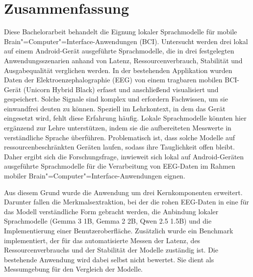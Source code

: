 \chapter*{Zusammenfassung}
Diese Bachelorarbeit behandelt die Eignung lokaler Sprachmodelle für mobile Brain"=Computer"=Interface-Anwendungen (BCI). Untersucht werden drei lokal auf einem Android-Gerät ausgeführte Sprachmodelle, die in drei festgelegten Anwendungsszenarien anhand von Latenz, Ressourcenverbrauch, Stabilität und Ausgabequalität verglichen werden. In der bestehenden Applikation wurden Daten der Elektroenzephalographie (EEG) von einem tragbaren mobilen BCI-Gerät (Unicorn Hybrid Black) erfasst und anschließend visualisiert und gespeichert. Solche Signale sind komplex und erfordern Fachwissen, um sie einwandfrei deuten zu können. Speziell im Lehrkontext, in dem das Gerät eingesetzt wird, fehlt diese Erfahrung häufig. Lokale Sprachmodelle könnten hier ergänzend zur Lehre unterstützen, indem sie die aufbereiteten Messwerte in verständliche Sprache überführen. Problematisch ist, dass solche Modelle auf ressourcenbeschränkten Geräten laufen, sodass ihre Tauglichkeit offen bleibt. Daher ergibt sich die Forschungsfrage, inwieweit sich lokal auf Android-Geräten ausgeführte Sprachmodelle für die Verarbeitung von EEG-Daten im Rahmen mobiler Brain"=Computer"=Interface-Anwendungen eignen.
\vspace{\baselineskip}

\noindent Aus diesem Grund wurde die Anwendung um drei Kernkomponenten erweitert. Darunter fallen die Merkmalsextraktion, bei der die rohen EEG-Daten in eine für das Modell verständliche Form gebracht werden, die Anbindung lokaler Sprachmodelle (Gemma 3 1B, Gemma 2 2B, Qwen 2.5 1.5B) und die Implementierung einer Benutzeroberfläche. Zusätzlich wurde ein Benchmark implementiert, der für das automatisierte Messen der Latenz, des Ressourcenverbrauchs und der Stabilität der Modelle zuständig ist. Die bestehende Anwendung wird dabei selbst nicht bewertet. Sie dient als Messumgebung für den Vergleich der Modelle.
\vspace{\baselineskip}

